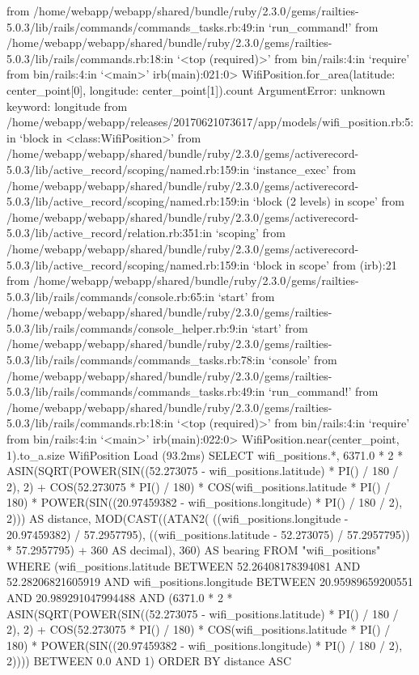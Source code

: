         from /home/webapp/webapp/shared/bundle/ruby/2.3.0/gems/railties-5.0.3/lib/rails/commands/commands_tasks.rb:49:in `run_command!'
        from /home/webapp/webapp/shared/bundle/ruby/2.3.0/gems/railties-5.0.3/lib/rails/commands.rb:18:in `<top (required)>'
        from bin/rails:4:in `require'
        from bin/rails:4:in `<main>'
irb(main):021:0> WifiPosition.for_area(latitude: center_point[0], longitude: center_point[1]).count
ArgumentError: unknown keyword: longitude
        from /home/webapp/webapp/releases/20170621073617/app/models/wifi_position.rb:5:in `block in <class:WifiPosition>'
        from /home/webapp/webapp/shared/bundle/ruby/2.3.0/gems/activerecord-5.0.3/lib/active_record/scoping/named.rb:159:in `instance_exec'
        from /home/webapp/webapp/shared/bundle/ruby/2.3.0/gems/activerecord-5.0.3/lib/active_record/scoping/named.rb:159:in `block (2 levels) in scope'
        from /home/webapp/webapp/shared/bundle/ruby/2.3.0/gems/activerecord-5.0.3/lib/active_record/relation.rb:351:in `scoping'
        from /home/webapp/webapp/shared/bundle/ruby/2.3.0/gems/activerecord-5.0.3/lib/active_record/scoping/named.rb:159:in `block in scope'
        from (irb):21
        from /home/webapp/webapp/shared/bundle/ruby/2.3.0/gems/railties-5.0.3/lib/rails/commands/console.rb:65:in `start'
        from /home/webapp/webapp/shared/bundle/ruby/2.3.0/gems/railties-5.0.3/lib/rails/commands/console_helper.rb:9:in `start'
        from /home/webapp/webapp/shared/bundle/ruby/2.3.0/gems/railties-5.0.3/lib/rails/commands/commands_tasks.rb:78:in `console'
        from /home/webapp/webapp/shared/bundle/ruby/2.3.0/gems/railties-5.0.3/lib/rails/commands/commands_tasks.rb:49:in `run_command!'
        from /home/webapp/webapp/shared/bundle/ruby/2.3.0/gems/railties-5.0.3/lib/rails/commands.rb:18:in `<top (required)>'
        from bin/rails:4:in `require'
        from bin/rails:4:in `<main>'
irb(main):022:0> WifiPosition.near(center_point, 1).to_a.size
  WifiPosition Load (93.2ms)  SELECT wifi_positions.*, 6371.0 * 2 * ASIN(SQRT(POWER(SIN((52.273075 - wifi_positions.latitude) * PI() / 180 / 2), 2) + COS(52.273075 * PI() / 180) * COS(wifi_positions.latitude * PI() / 180) * POWER(SIN((20.97459382 - wifi_positions.longitude) * PI() / 180 / 2), 2))) AS distance, MOD(CAST((ATAN2( ((wifi_positions.longitude - 20.97459382) / 57.2957795), ((wifi_positions.latitude - 52.273075) / 57.2957795)) * 57.2957795) + 360 AS decimal), 360) AS bearing FROM "wifi_positions" WHERE (wifi_positions.latitude BETWEEN 52.26408178394081 AND 52.28206821605919 AND wifi_positions.longitude BETWEEN 20.95989659200551 AND 20.989291047994488 AND (6371.0 * 2 * ASIN(SQRT(POWER(SIN((52.273075 - wifi_positions.latitude) * PI() / 180 / 2), 2) + COS(52.273075 * PI() / 180) * COS(wifi_positions.latitude * PI() / 180) * POWER(SIN((20.97459382 - wifi_positions.longitude) * PI() / 180 / 2), 2)))) BETWEEN 0.0 AND 1) ORDER BY distance ASC
